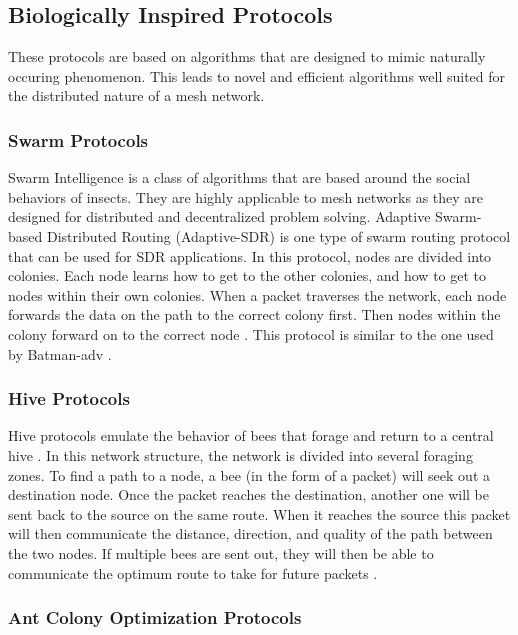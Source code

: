 \subsection{Biologically Inspired Protocols}

These protocols are based on algorithms that are designed to mimic naturally occuring phenomenon. This leads to novel and efficient algorithms well suited for the distributed nature of a mesh network.

\subsubsection{Swarm Protocols}

Swarm Intelligence is a class of algorithms that are based around the social behaviors of insects. They are highly applicable to mesh networks as they are designed for distributed and decentralized problem solving. Adaptive Swarm-based Distributed Routing (Adaptive-SDR) is one type of swarm routing protocol that can be used for SDR applications. In this protocol, nodes are divided into colonies. Each node learns how to get to the other colonies, and how to get to nodes within their own colonies. When a packet traverses the network, each node forwards the data on the path to the correct colony first. Then nodes within the colony forward on to the correct node \cite{1005496}. This protocol is similar to the one used by Batman-adv \cite{0033}.


\subsubsection{Hive Protocols}

Hive protocols emulate the behavior of bees that forage and return to a central hive \cite{6863008}. In this network structure, the network is divided into several foraging zones. To find a path to a node, a bee (in the form of a packet) will seek out a destination node. Once the packet reaches the destination, another one will be sent back to the source on the same route. When it reaches the source this packet will then communicate the distance, direction, and quality of the path between the two nodes. If multiple bees are sent out, they will then be able to communicate the optimum route to take for future packets \cite{7373160}. 

\subsubsection{Ant Colony Optimization Protocols}

